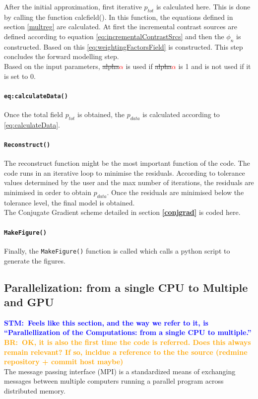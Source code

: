\documentclass[10pt,a4paper]{article}
\newcommand{\commentstm}[1]{\textcolor{blue}{\textbf{STM:\ #1}}}
\newcommand{\newstm}[1]{\textcolor{red}{\textbf{#1}}}
\newcommand{\newstmtwo}[1]{\textcolor{orange}{\textbf{#1}}}
\newcommand{\oldstm}[1]{\sout{#1}}
\newcommand{\oldstmtwo}[1]{\xout{#1}}
\newcommand{\commentbr}[1]{\textcolor{orange}{\textbf{BR:\ #1}}}
\begin{document}
After the initial approximation, first iterative $p_{tot}$ is
calculated here. This is done by calling the function calcfield(). In
this function, the equations defined in section \oldstmtwo{2.5} \ref{multreg} are calculated.
At first the incremental contrast sources are defined according to
equation \ref{eq:incrementalContrastSrcs} and then the $\phi_n$ is constructed. Based on
this \ref{eq:weightingFactorsField} is constructed. This step concludes the forward
modelling step.\\

Based on the input parameters, \oldstm{alpha}\newstm{$\alpha$} is used
if \oldstm{alpha}\newstm{$\alpha$} is 1 and is not used if it is set
to 0.

\paragraph{\texttt{eq:calculateData()}}
Once the total field $p_{tot}$ is obtained, the $p_{data}$ is
calculated according to \ref{eq:calculateData}.

\paragraph{\texttt{Reconstruct()}}
The reconstruct function might be the most important function of the
code. The code runs in an iterative loop to minimise the residuals.
According to tolerance values determined by the user and the max
number of iterations, the residuals are minimised in order to obtain
$p_{data}$. Once the residuals are minimised below the tolerance
level, the final model is obtained.\\

The Conjugate Gradient scheme detailed in section \oldstmtwo{2.4}\newstmtwo{\ref{conjgrad}} is coded here.

\paragraph{\texttt{MakeFigure()}}

Finally, the \texttt{MakeFigure()} function is called which calls a
python script to generate the figures.

\subsection{Parallelization: from a single CPU to Multiple and GPU}
\commentstm{Feels like this section, and the way we refer to it, is
``Parallellization of the Computations: from a single CPU to
multiple.''}
\commentbr{OK, it is also the first time the code is referred. Does
this always remain relevant? If so, incldue a reference to the the
source (redmine repository + commit host maybe)}\\
The message passing interface (MPI) is a standardized means of
exchanging messages between multiple computers running a parallel
program across distributed memory.
\end{document}
